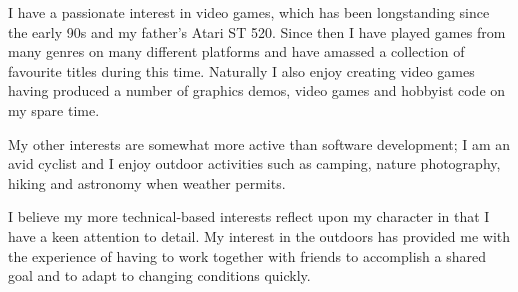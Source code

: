 
\begin{cvparagraph}

I have a passionate interest in video games, which has been longstanding since the early 90s and my father’s Atari
ST 520. Since then I have played games from many genres on many different platforms and have amassed a collection of
favourite titles during this time. Naturally I also enjoy creating video games having produced a number of graphics
demos, video games and hobbyist code on my spare time.

\end{cvparagraph}

\begin{cvparagraph}

My other interests are somewhat more active than software development; I am an avid cyclist and I enjoy outdoor
activities such as camping, nature photography, hiking and astronomy when weather permits.

\end{cvparagraph}

\begin{cvparagraph}

I believe my more technical-based interests reflect upon my character in that I have a keen attention to detail.
My interest in the outdoors has provided me with the experience of having to work together with friends to accomplish a
shared goal and to adapt to changing conditions quickly.

\end{cvparagraph}
